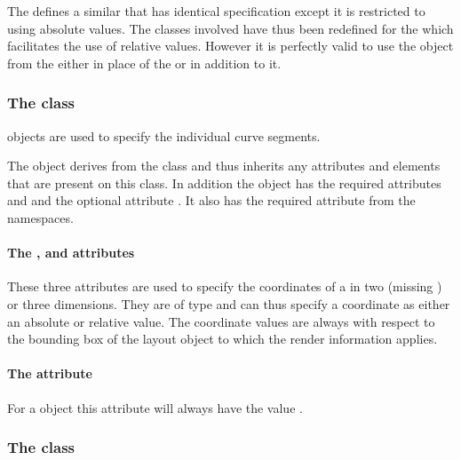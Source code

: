 The \LayoutPackage defines a similar  that has identical specification except it is restricted to using absolute values.  The classes involved have thus been redefined for the \RenderPackage which facilitates the use of relative values. However it is perfectly valid to use the  object from the \LayoutPackage either in place of the \ListOfElements or in addition to it. 

\subsubsection{The  class}
\label{renderpoint-class}

\RenderPoint objects are used to 
specify the individual curve segments.

The \RenderPoint object derives from the \SBase class and thus inherits
any attributes and elements that are present on this class.
In addition the \RenderPoint object has the required attributes  and  and the optional attribute . It also has the required attribute  from the  namespaces.

\paragraph{The \fixttspace{}, \fixttspace{} and \fixttspace{} attributes}

These three attributes are used to specify the coordinates of a  \RenderPoint in two (missing ) or three dimensions. They are of type \RelAbsVector and can thus specify a coordinate as either an absolute or relative value. The coordinate
values are always with respect to the bounding box of the layout object to which the
render information applies.

\paragraph{The \fixttspace{} attribute}

For a \RenderPoint object this attribute will always have the value .


\subsubsection{The  class}
\label{rendercubicbezier-class}


